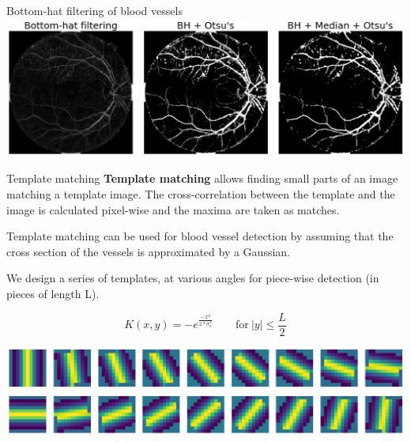 \documentclass[9pt, aspectratio=169]{beamer}
\begin{document}
\begin{frame}
    {Bottom-hat filtering of blood vessels}
    \centering
    \includegraphics[width=\textwidth]{retina_bottomhat.png}
\end{frame}
\begin{frame}
    {Template matching}
    \textbf{Template matching} allows finding small parts of an image matching a template image. The cross-correlation between the template and the image is calculated pixel-wise and the maxima are taken as matches.


    \pause
    Template matching can be used for blood vessel detection by assuming that the cross section of the vessels is approximated by a Gaussian.

    \pause
    We design a series of templates, at various angles for piece-wise detection (in pieces of length L).

    $$K(x, y) = - e^{\frac{-x^2}{2*\sigma_x^2}}\qquad \text{for}~|y| \leq \frac{L}{2}$$

    \centering
    \includegraphics[width=.9\textwidth]{template_matching_kernels.png}
\end{frame}
\end{document}
